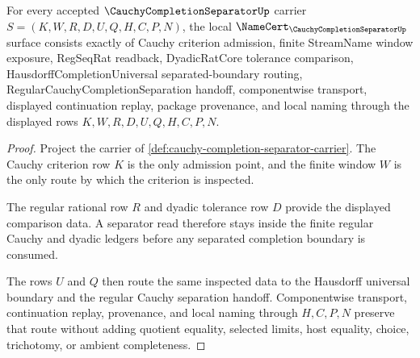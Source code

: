\begin{theorem}
\label{thm:cauchy-completion-separator-namecert-obligations}
For every accepted $\CauchyCompletionSeparatorUp$ carrier $S=(K,W,R,D,U,Q,H,C,P,N)$, the local $\NameCert_{\CauchyCompletionSeparatorUp}$ surface consists exactly of Cauchy criterion admission, finite StreamName window exposure, RegSeqRat readback, DyadicRatCore tolerance comparison, HausdorffCompletionUniversal separated-boundary routing, RegularCauchyCompletionSeparation handoff, componentwise transport, displayed continuation replay, package provenance, and local naming through the displayed rows $K,W,R,D,U,Q,H,C,P,N$.
\end{theorem}
\begin{proof}
Project the carrier of \autoref{def:cauchy-completion-separator-carrier}. The Cauchy criterion row $K$ is the only admission point, and the finite window $W$ is the only route by which the criterion is inspected.

The regular rational row $R$ and dyadic tolerance row $D$ provide the displayed comparison data. A separator read therefore stays inside the finite regular Cauchy and dyadic ledgers before any separated completion boundary is consumed.

The rows $U$ and $Q$ then route the same inspected data to the Hausdorff universal boundary and the regular Cauchy separation handoff. Componentwise transport, continuation replay, provenance, and local naming through $H,C,P,N$ preserve that route without adding quotient equality, selected limits, host equality, choice, trichotomy, or ambient completeness.
\end{proof}

